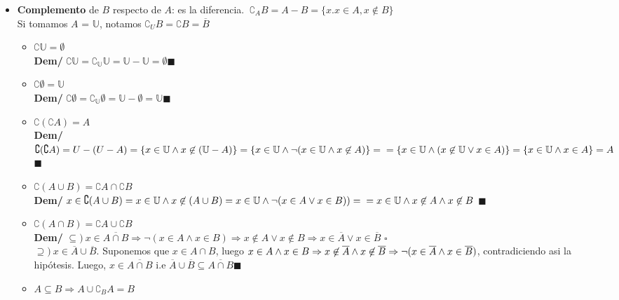 \documentclass[11pt,a4paper]{article}
\newcommand*{\QEDA}{\null\nobreak\hfill\ensuremath{\blacksquare}}
\newcommand*{\QEDB}{\null\nobreak\hfill\ensuremath{\square}}
\begin{document}
\begin{itemize}
\item \textbf{Complemento} de $B$ respecto de $A$: es la diferencia. $\ \complement_A B = A-B = \{x.x\in A, x\not \in B\}$\\
Si tomamos $A$ = $\mathbb{U}$, notamos $\complement_U B = \complement B = \overline{B}$
\begin{itemize}
\item $\complement \mathbb{U} = \emptyset$\\
\textbf{Dem/} $\complement\mathbb{U} = \complement_\mathbb{U} \mathbb{U} = \mathbb{U} - \mathbb{U} = \emptyset $\QEDA
\item $\complement \emptyset = \mathbb{U}$\\
\textbf{Dem/} $\complement \emptyset = \complement_\mathbb{U} \emptyset = \mathbb{U} - \emptyset = \mathbb{U} $\QEDA
\item $\complement (\complement A) = A$\\
\textbf{Dem/} $\complement (\complement A) = U - (U - A) = \{ x \in \mathbb{U} \land x \not \in (\mathbb{U} - A)\} = \{x \in \mathbb{U} \land \lnot (x \in \mathbb{U} \land x \not \in A)\} = \\ = \{x \in \mathbb{U} \land (x \not \in \mathbb{U} \lor x \in A)\} = \{ x \in \mathbb{U} \land x \in A\} = A$\QEDA
\item $\complement (A \cup B) = \complement A \cap \complement B$\\
\textbf{Dem/} $x \in \complement (A \cup B) = x \in \mathbb{U} \land x \not \in (A \cup B) = x \in \mathbb{U} \land \lnot (x \in A \lor x \in B)) = \\ = x \in \mathbb{U} \land x \not \in A \land x \not \in B$ \QEDA
\item $\complement (A \cap B) = \complement A \cup \complement B$\\
\textbf{Dem/} $\subseteq)\ x \in \overline{A \cap B} \Rightarrow \lnot(x \in A \land x \in B) \Rightarrow x \not \in A \lor x \not \in B \Rightarrow x \in \overline{A} \lor x \in \overline{B}$ \QEDB\\
$\supseteq)\ x \in \overline{A} \cup \overline{B}$. Suponemos que $x \in A\cap B$, luego $x \in A \land x \in B \Rightarrow x \not \in \overline{A} \land x \not \in \overline{B} \Rightarrow \\ \lnot (x \in \overline{A} \land x \in \overline{B})$, contradiciendo asi la hip\'otesis. Luego, $x \in \overline{A \cap B}$ i.e $\overline{A} \cup \overline{B} \subseteq \overline{A \cap B}$\QEDA
\item $A \subseteq B \Rightarrow A \cup \complement_B A = B$\\

\end{itemize}
\end{itemize}
\end{document}
